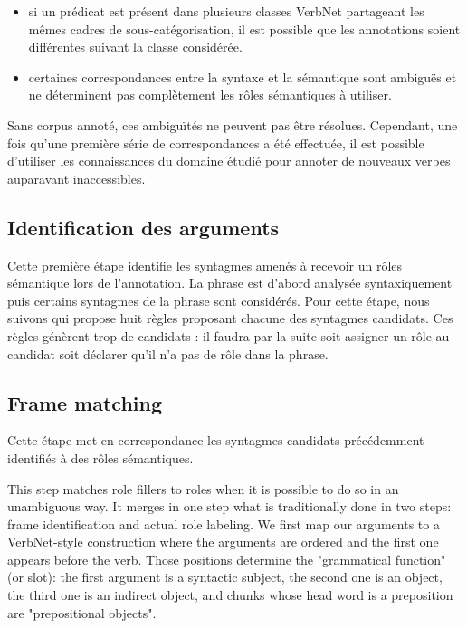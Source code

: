 \begin{itemize}

    \item si un prédicat est présent dans plusieurs classes VerbNet partageant
    les mêmes cadres de sous-catégorisation, il est possible que les annotations
    soient différentes suivant la classe considérée.

    \item certaines correspondances entre la syntaxe et la sémantique sont
    ambiguës et ne déterminent pas complètement les rôles sémantiques à utiliser.

\end{itemize}

Sans corpus annoté, ces ambiguïtés ne peuvent pas être résolues. Cependant, une
fois qu'une première série de correspondances a été effectuée, il est possible
d'utiliser les connaissances du domaine étudié pour annoter de nouveaux verbes
auparavant inaccessibles.

\subsection{Identification des arguments}

Cette première étape identifie les syntagmes amenés à recevoir un rôles
sémantique lors de l'annotation. La phrase est d'abord analysée syntaxiquement
puis certains syntagmes de la phrase sont considérés. Pour cette étape, nous
suivons \cite{lang2011unsupervised} qui propose huit règles proposant chacune
des syntagmes candidats. Ces règles génèrent trop de candidats : il faudra par
la suite soit assigner un rôle au candidat soit déclarer qu'il n'a pas de rôle
dans la phrase.


\subsection{Frame matching}

Cette étape met en correspondance les syntagmes candidats précédemment
identifiés à des rôles sémantiques.

This step matches role fillers to roles when it is possible to do so in an
unambiguous way. It merges in one step what is traditionally done in two steps:
frame identification and actual role labeling. We first map our arguments to a
VerbNet-style construction where the arguments are ordered and the first one
appears before the verb. Those positions determine the "grammatical function"
(or slot): the first argument is a syntactic subject, the second one is an
object, the third one is an indirect object, and chunks whose head word is a
preposition are "prepositional objects".


